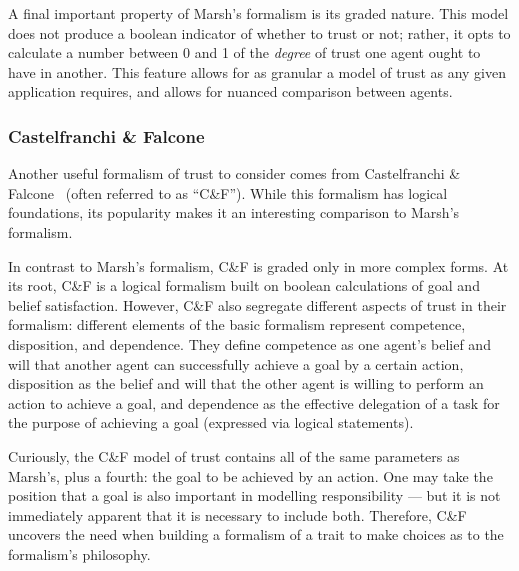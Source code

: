 A final important property of Marsh's formalism is its graded nature. This model does not produce a boolean indicator of whether to trust or not; rather, it opts to calculate a number between 0 and 1 of the \emph{degree} of trust one agent ought to have in another. This feature allows for as granular a model of trust as any given application requires, and allows for nuanced comparison between agents.\par


\subsubsection{Castelfranchi \& Falcone}
Another useful formalism of trust to consider comes from Castelfranchi \& Falcone~\cite{CastelfranchiSocialApproach} (often referred to as ``C\&F''). While this formalism has logical foundations, its popularity makes it an interesting comparison to Marsh's formalism.\par

In contrast to Marsh's formalism, C\&F is graded only in more complex forms. At its root, C\&F is a logical formalism built on boolean calculations of goal and belief satisfaction. However, C\&F also segregate different aspects of trust in their formalism: different elements of the basic formalism represent competence, disposition, and dependence. They define competence as one agent's belief and will that another agent can successfully achieve a goal by a certain action, disposition as the belief and will that the other agent is willing to perform an action to achieve a goal, and dependence as the effective delegation of a task for the purpose of achieving a goal (expressed via logical statements).\par

Curiously, the C\&F model of trust contains all of the same parameters as Marsh's, plus a fourth: the goal to be achieved by an action. One may take the position that a goal is also important in modelling responsibility --- but it is not immediately apparent that it is necessary to include both. Therefore, C\&F uncovers the need when building a formalism of a trait to make choices as to the formalism's philosophy.\par

